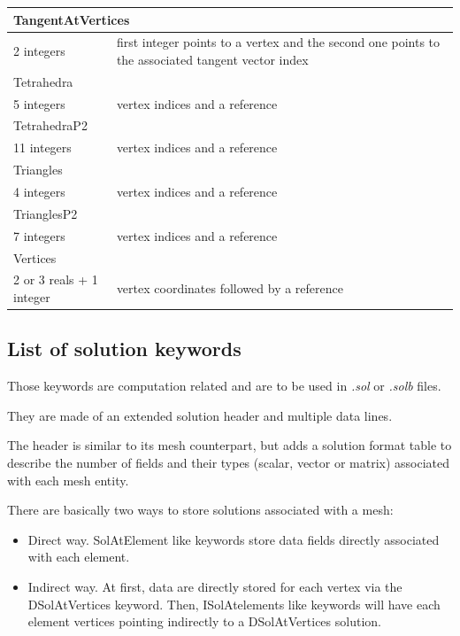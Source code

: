\documentclass[a4paper,12pt]{article}
\begin{document}
\begin{longtable}{|m{4cm}|m{11cm}|}
\multicolumn{2}{|l|}{TangentAtVertices} \\
\hline
2 integers & first integer points to a vertex and the second one points to the associated tangent vector index \\
\hline

\multicolumn{2}{|l|}{Tetrahedra} \\
\hline
5 integers & vertex indices and a reference \\
\hline\hline

\multicolumn{2}{|l|}{TetrahedraP2} \\
\hline
11 integers & vertex indices and a reference \\
\hline\hline

\multicolumn{2}{|l|}{Triangles} \\
\hline
4 integers & vertex indices and a reference \\
\hline\hline

\multicolumn{2}{|l|}{TrianglesP2} \\
\hline
7 integers & vertex indices and a reference \\
\hline\hline

\multicolumn{2}{|l|}{Vertices} \\
\hline
2 or 3 reals + 1 integer & vertex coordinates followed by a reference \\
\hline

\end{longtable}


\subsection{List of solution keywords}

Those keywords are computation related and are to be used in \emph{.sol} or \emph{.solb} files.

They are made of an extended solution header and multiple data lines.

The header is similar to its mesh counterpart, but adds a solution format table to describe the number of fields and their types (scalar, vector or matrix) associated with each mesh entity.

There are basically two ways to store solutions associated with a mesh:

\begin{itemize}
\item Direct way. SolAtElement like keywords store data fields directly associated with each element.
\item Indirect way. At first, data are directly stored for each vertex via the DSolAtVertices keyword. Then, ISolAtelements like keywords will have each element vertices pointing indirectly to a DSolAtVertices solution.
\end{itemize}
\end{document}
